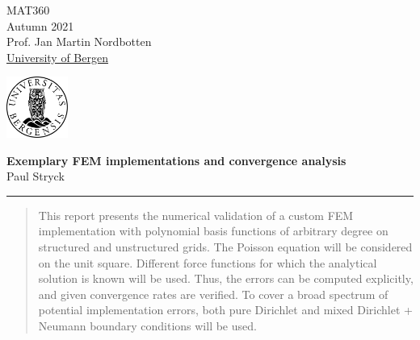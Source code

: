 \documentclass[11pt,a4paper]{article}
\begin{document}
\usetikzlibrary{positioning}

\pagestyle{plain}

\begin{multicols}{2}
  \begin{flushleft}
    MAT360 \\
    Autumn 2021\\
    Prof. Jan Martin Nordbotten\\
    \underline{University of Bergen}
  \end{flushleft}
  \vfill\null
  \columnbreak

  \begin{flushright}
    \includegraphics[height=2cm]{assets/uib.logo.png}
  \end{flushright}
\end{multicols}

\begin{center}
\textbf{\large Exemplary FEM implementations and convergence analysis}\\
Paul Stryck\\
\end{center}
\rule{\linewidth}{0.1mm}



\begin{abstract}
    \noindent
    This report presents the numerical validation of a custom FEM implementation with polynomial basis
    functions of arbitrary degree on structured and unstructured grids.
    The Poisson equation will be considered on the unit square.
    Different force functions for which the analytical solution is known will be used.
    Thus, the errors can be computed explicitly, and given convergence rates are verified.
    To cover a broad spectrum of potential implementation errors, both pure Dirichlet and mixed Dirichlet +
    Neumann boundary conditions will be used.
\end{abstract}
\end{document}
